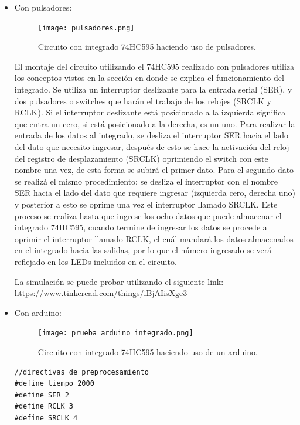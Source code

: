 \documentclass{article}
\begin{document}
\begin{itemize}
\item Con pulsadores: 

\begin{figure}[h]
\texttt{[image: pulsadores.png]}
\centering
\caption{Circuito con integrado 74HC595 haciendo uso de pulsadores.}
\label{fig:pulsadores}
\end{figure}

El montaje del circuito utilizando el 74HC595 realizado con pulsadores utiliza los conceptos vistos en la sección en donde se explica el funcionamiento del integrado. 
Se utiliza un interruptor deslizante para la entrada serial (SER), y dos pulsadores o switches que harán el trabajo de los relojes (SRCLK y RCLK). Si el interruptor deslizante está posicionado a la izquierda significa que entra un cero, si está posicionado a la derecha, es un uno. 
Para realizar la entrada de los datos al integrado, se desliza el interruptor SER hacia el lado del dato que necesito ingresar, después de esto se hace la activación del reloj del registro de desplazamiento (SRCLK) oprimiendo el switch con este nombre una vez, de esta forma se subirá el primer dato. Para el segundo dato se realizá el mismo procedimiento: se desliza el interruptor con el nombre SER hacia el lado del dato que requiere ingresar (izquierda cero, derecha uno) y posterior a esto se oprime una vez el interruptor llamado SRCLK. Este proceso se realiza hasta que ingrese los ocho datos que puede almacenar el integrado 74HC595, cuando termine de ingresar los datos se procede a oprimir el interruptor llamado RCLK, el cuál mandará los datos almacenados en el integrado hacia las salidas, por lo que el número ingresado se verá reflejado en los LEDs incluidos en el circuito.

La simulación se puede probar utilizando el siguiente link: \url{https://www.tinkercad.com/things/iBjAIisXge3}

\newpage
\item Con arduino: 

\begin{figure}[h]
\texttt{[image: prueba arduino integrado.png]}
\centering
\caption{Circuito con integrado 74HC595 haciendo uso de un arduino.}
\label{fig:reemplazo pulsador por arduino}
\end{figure}

\begin{lstlisting}[style=myArduino]
//directivas de preprocesamiento
#define tiempo 2000
#define SER 2
#define RCLK 3
#define SRCLK 4



\end{lstlisting}
\end{itemize}
\end{document}

